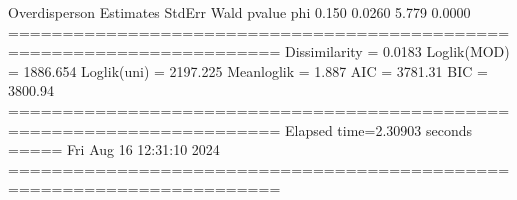 \documentclass[letterpaper,10pt,english]{sphinxmanual}
\begin{document}
\begin{sphinxVerbatim}[commandchars=\\\{\}]
Overdisperson
          Estimates  StdErr    Wald  p\PYGZhy{}value
phi           0.150  0.0260   5.779   0.0000
=======================================================================
Dissimilarity = 0.0183
Loglik(MOD)   = \PYGZhy{}1886.654
Loglik(uni)   = \PYGZhy{}2197.225
Mean\PYGZhy{}loglik   = \PYGZhy{}1.887
\PYGZhy{}\PYGZhy{}\PYGZhy{}\PYGZhy{}\PYGZhy{}\PYGZhy{}\PYGZhy{}\PYGZhy{}\PYGZhy{}\PYGZhy{}\PYGZhy{}\PYGZhy{}\PYGZhy{}\PYGZhy{}\PYGZhy{}\PYGZhy{}\PYGZhy{}\PYGZhy{}\PYGZhy{}\PYGZhy{}\PYGZhy{}\PYGZhy{}\PYGZhy{}\PYGZhy{}\PYGZhy{}\PYGZhy{}\PYGZhy{}\PYGZhy{}\PYGZhy{}\PYGZhy{}\PYGZhy{}\PYGZhy{}\PYGZhy{}\PYGZhy{}\PYGZhy{}\PYGZhy{}\PYGZhy{}\PYGZhy{}\PYGZhy{}\PYGZhy{}\PYGZhy{}\PYGZhy{}\PYGZhy{}\PYGZhy{}\PYGZhy{}\PYGZhy{}\PYGZhy{}\PYGZhy{}\PYGZhy{}\PYGZhy{}\PYGZhy{}\PYGZhy{}\PYGZhy{}\PYGZhy{}\PYGZhy{}\PYGZhy{}\PYGZhy{}\PYGZhy{}\PYGZhy{}\PYGZhy{}\PYGZhy{}\PYGZhy{}\PYGZhy{}\PYGZhy{}\PYGZhy{}\PYGZhy{}\PYGZhy{}\PYGZhy{}\PYGZhy{}\PYGZhy{}\PYGZhy{}
AIC = 3781.31
BIC = 3800.94
=======================================================================
Elapsed time=2.30903 seconds =====\PYGZgt{}\PYGZgt{}\PYGZgt{} Fri Aug 16 12:31:10 2024
=======================================================================
\end{sphinxVerbatim}

\noindent{}
\end{document}
